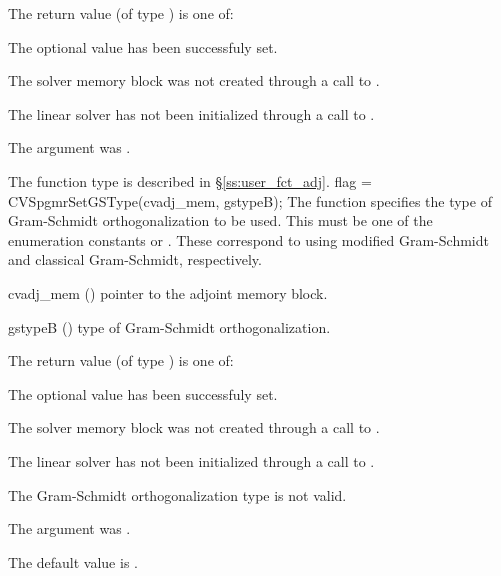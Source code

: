 {
  The return value  (of type ) is one of:
  \begin{args}
  \item[\Id{CVSPGMR\_SUCCESS}] 
    The optional value has been successfuly set.
  \item[\Id{CVSPGMR\_MEM\_NULL}]
    The {\cvodes} solver memory block was not created through a call to .
  \item[\Id{CVSPGMR\_LMEM\_NULL}]
    The {\cvspgmr} linear solver has not been initialized through a call to .
  \item[\Id{CV\_ADJMEM\_NULL}]
    The  argument was .
  \end{args}
}
{
  The function type  is described in \S\ref{ss:user_fct_adj}.
}
{
  flag = CVSpgmrSetGSType(cvadj\_mem, gstypeB);
}
{
  The function  specifies the type of
  Gram-Schmidt orthogonalization to be used. 
  This must be one of the enumeration constants 
  or . These correspond to using modified Gram-Schmidt 
  and classical Gram-Schmidt, respectively. 
}
{
  \begin{args}
  \item[cvadj\_mem] ()
    pointer to the adjoint memory block.
  \item[gstypeB] ()
    type of Gram-Schmidt orthogonalization.
  \end{args}
}
{
  The return value  (of type ) is one of:
  \begin{args}
  \item[\Id{CVSPGMR\_SUCCESS}] 
    The optional value has been successfuly set.
  \item[\Id{CVSPGMR\_MEM\_NULL}]
    The {\cvodes} solver memory block was not created through a call to .
  \item[\Id{CVSPGMR\_LMEM\_NULL}]
    The {\cvspgmr} linear solver has not been initialized through a call to .
  \item[\Id{CVSPGMR\_ILL\_INPUT}]
    The Gram-Schmidt orthogonalization type  is not valid.
  \item[\Id{CV\_ADJMEM\_NULL}]
    The  argument was .
  \end{args}
}
{
  The default value is .
}
